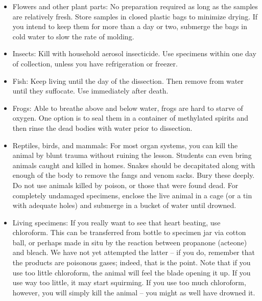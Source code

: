 \begin{itemize}

\item{Flowers and other plant parts: 
No preparation required as long as the samples are relatively fresh. 
Store samples in closed plastic bags to minimize drying. 
If you intend to keep them for more than a day or two, 
submerge the bags in cold water to slow the rate of molding.}

\item{Insects: Kill with household aerosol insecticide. 
Use specimens within one day of collection, 
unless you have refrigeration or freezer.}

\item{Fish: Keep living until the day of the dissection. 
Then remove from water until they suffocate. 
Use immediately after death.}

\item{Frogs: Able to breathe above and below water, 
frogs are hard to starve of oxygen. 
One option is to seal them in a container of methylated spirits 
and then rinse the dead bodies with water prior to dissection.}

\item{Reptiles, birds, and mammals: For most organ systems, 
you can kill the animal by blunt trauma without ruining the lesson. 
Students can even bring animals caught and killed in homes. 
Snakes should be decapitated along with enough of the body 
to remove the fangs and venom sacks. 
Bury these deeply. 
Do not use animals killed by poison, 
or those that were found dead. 
For completely undamaged specimens, 
enclose the live animal in a cage (or a tin with adequate holes) 
and submerge in a bucket of water until drowned.}

\item{Living specimens: 
If you really want to see that heart beating, use chloroform. 
This can be transferred from bottle to specimen jar via cotton ball, 
or perhaps made in situ by the reaction between propanone (acteone) and bleach. 
We have not yet attempted the latter – 
if you do, remember that the products are poisonous gases; 
indeed, that is the point. Note that if you use too little chloroform, 
the animal will feel the blade opening it up. 
If you use way too little, it may start squirming. 
If you use too much chloroform, however, you will simply kill the animal – 
you might as well have drowned it.}

\end{itemize}

